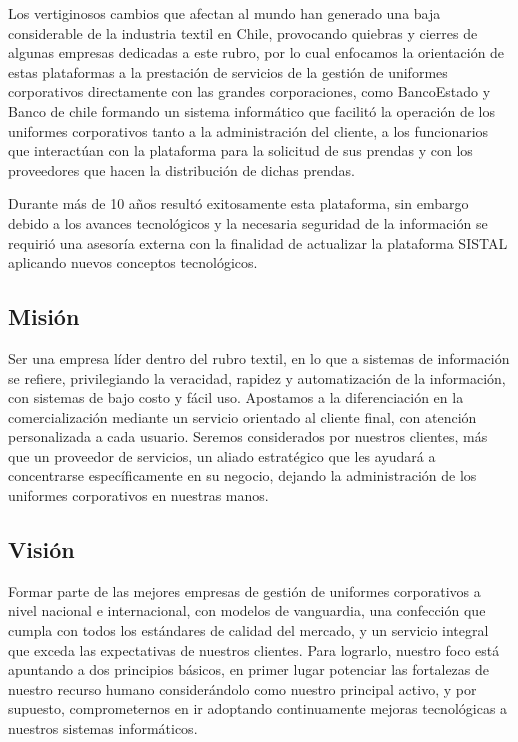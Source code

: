 Los vertiginosos cambios que afectan al mundo han generado una baja considerable de la industria textil en Chile, provocando quiebras y cierres de algunas empresas dedicadas a este rubro, por lo cual enfocamos la orientación de estas plataformas a la prestación de servicios de la gestión de uniformes corporativos directamente con las grandes corporaciones, como BancoEstado y Banco de chile formando un sistema informático que facilitó la operación de los uniformes corporativos tanto a la administración del cliente, a los funcionarios que interactúan con la plataforma para la solicitud de sus prendas y con los proveedores que hacen la distribución de dichas prendas.

Durante más de 10 años resultó exitosamente esta plataforma, sin embargo debido a los avances tecnológicos y la necesaria seguridad de la información se requirió una asesoría externa con la finalidad de actualizar la plataforma SISTAL aplicando nuevos conceptos tecnológicos.

\subsection{Misión}

Ser una empresa líder dentro del rubro textil, en lo que a sistemas de información se refiere, privilegiando la veracidad, rapidez y automatización de la información, con sistemas de bajo costo y fácil uso. Apostamos a la diferenciación en la comercialización mediante un servicio orientado al cliente final, con atención personalizada a cada usuario. Seremos considerados por nuestros clientes, más que un proveedor de servicios, un aliado estratégico que les ayudará a concentrarse específicamente en su negocio, dejando la administración de los uniformes corporativos en nuestras manos.

\subsection{Visión}

Formar parte de las mejores empresas de gestión de uniformes corporativos a nivel nacional e internacional, con modelos de vanguardia, una confección que cumpla con todos los estándares de calidad del mercado, y un servicio integral que exceda las expectativas de nuestros clientes. Para lograrlo, nuestro foco está apuntando a dos principios básicos, en primer lugar potenciar las fortalezas de nuestro recurso humano considerándolo como nuestro principal activo, y por supuesto, comprometernos en ir adoptando continuamente mejoras tecnológicas a nuestros sistemas informáticos.

